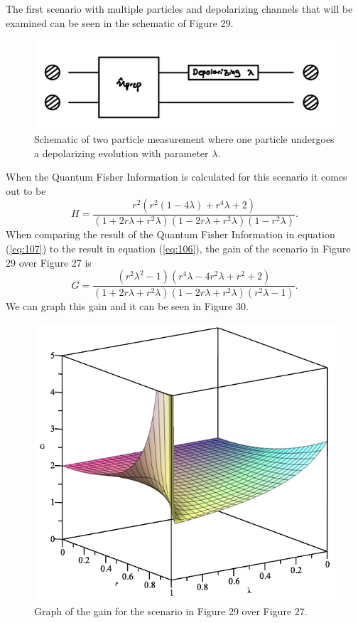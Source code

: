 \documentclass[twocolumn]{article}
\begin{document}
The first scenario with multiple particles and depolarizing channels that will be examined can be seen in the schematic of Figure 29.
\newpage
\begin{figure}[h]
\begin{center}
\includegraphics[width=0.65\linewidth]{Depolarizing-Double-Channel-Lambda-Schematic.jpg}
\caption{Schematic of two particle measurement where one particle undergoes a depolarizing evolution with parameter $\lambda$.}
\end{center}
\end{figure}
When the Quantum Fisher Information is calculated for this scenario it comes out to be
\begin{equation}\label{eq:107}
H=\frac{r^2(r^2(1-4\lambda)+r^4\lambda+2)}{(1+2r\lambda+r^2\lambda)(1-2r\lambda+r^2\lambda)(1-r^2\lambda)}.
\end{equation}
When comparing the result of the Quantum Fisher Information in equation (\ref{eq:107}) to the result in equation (\ref{eq:106}), the gain of the scenario in Figure 29 over Figure 27 is
\begin{equation}\label{eq:108}
G=\frac{(r^2\lambda^2-1)(r^4\lambda-4r^2\lambda+r^2+2)}{(1+2r\lambda+r^2\lambda)(1-2r\lambda+r^2\lambda)(r^2\lambda-1)}.
\end{equation}
We can graph this gain and it can be seen in Figure 30.
\begin{figure}[h]
\begin{center}
\includegraphics[width=0.65\linewidth]{Depolarizing-Double-Channel-Lambda-Gain-Graph.png}
\caption{Graph of the gain for the scenario in Figure 29 over Figure 27.}
\end{center}
\end{figure}
\end{document}
